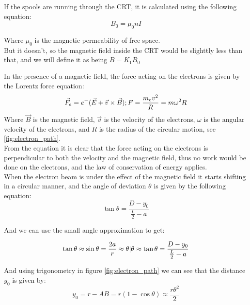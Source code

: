 \documentclass[12pt]{article}
\begin{document}
If the spools are running through the CRT, it is calculated using the following equation:
$$B_0 = {\mu_0 n I}$$

Where $\mu_0$ is the magnetic permeability of free space.\\
But it doesn't, so the magnetic field inside the CRT would be slighttly less than that, and we will define it as being $B = K_1 B_0$

In the presence of a magnetic field, the force acting on the electrons is given by the Lorentz force equation:
\begin{equation} \label{Lorentz force}
    \vec F_e = e^- (\vec E + \vec v \times \vec B);\\
F = \frac{m_e v^2}{R} = m\omega^2 R
\end{equation}
\FloatBarrier
Where $\vec B$ is the magnetic field, $\vec v$ is the velocity of the electrons, $\omega$ is the angular velocity of the electrons, and $R$ is the radius of the circular motion, see \ref{fig:electron_path}.\\

From the equation it is clear that the force acting on the electrons is perpendicular to both the velocity and the magnetic field, thus no work would be done on the electrons, and the law of conservation of energy applies.\\ 


When the electron beam is under the effect of the magnetic field it starts shifting in a circular manner, and the angle of deviation $\theta$ is given by the following equation:
\begin{equation}
    \tan{\theta} = \frac{D - y_0}{\frac L 2 - a}
\end{equation}

And we can use the small angle approximation to get:

\begin{equation}\label{angle approximation}
    \tan{\theta} \approx \sin{\theta} = \frac{2a}{r} \approx \theta 
    \\ \vert \theta \approx \tan{\theta} = \frac{D - y_0}{\frac L 2 - a}
\end{equation}

And using trigonometry in figure \ref{fig:electron_path} we can see that the distance $y_0$ is given by:
\begin{equation} \label{hight approximation}
    y_0 = r - AB = r(1-\cos{\theta}) \approx \frac{r \theta^2}{2}
\end{equation}
\end{document}
